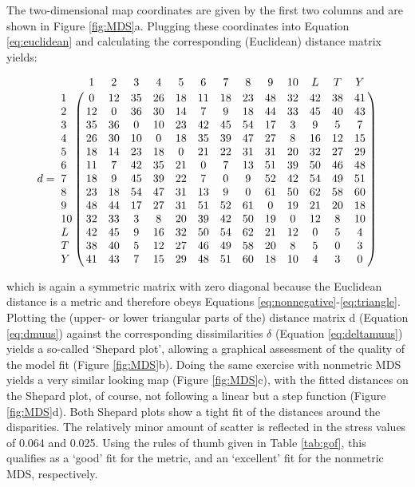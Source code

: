 \documentclass[authoryear,preprint,review,12pt]{elsarticle}
\begin{document}
The two-dimensional map coordinates are given by the first two columns
and are shown in Figure \ref{fig:MDS}a. Plugging these coordinates
into Equation \ref{eq:euclidean} and calculating the corresponding
(Euclidean) distance matrix yields:

\begin{equation}
d = \bordermatrix{
~ & 1 & 2 & 3 & 4 & 5 & 6 & 7 & 8 & 9 & 10 & L & T & Y\cr
1 & 0 & 12 & 35 & 26 & 18 & 11 & 18 & 23 & 48 & 32 & 42 & 38 & 41 \cr
2 & 12 & 0 & 36 & 30 & 14 & 7 & 9 & 18 & 44 & 33 & 45 & 40 & 43 \cr
3 & 35 & 36 & 0 & 10 & 23 & 42 & 45 & 54 & 17 & 3 & 9 & 5 & 7 \cr
4 & 26 & 30 & 10 & 0 & 18 & 35 & 39 & 47 & 27 & 8 & 16 & 12 & 15 \cr
5 & 18 & 14 & 23 & 18 & 0 & 21 & 22 & 31 & 31 & 20 & 32 & 27 & 29 \cr
6 & 11 & 7 & 42 & 35 & 21 & 0 & 7 & 13 & 51 & 39 & 50 & 46 & 48 \cr
7 & 18 & 9 & 45 & 39 & 22 & 7 & 0 & 9 & 52 & 42 & 54 & 49 & 51 \cr
8 & 23 & 18 & 54 & 47 & 31 & 13 & 9 & 0 & 61 & 50 & 62 & 58 & 60 \cr
9 & 48 & 44 & 17 & 27 & 31 & 51 & 52 & 61 & 0 & 19 & 21 & 20 & 18 \cr
10 & 32 & 33 & 3 & 8 & 20 & 39 & 42 & 50 & 19 & 0 & 12 & 8 & 10 \cr
L & 42 & 45 & 9 & 16 & 32 & 50 & 54 & 62 & 21 & 12 & 0 & 5 & 4 \cr
T & 38 & 40 & 5 & 12 & 27 & 46 & 49 & 58 & 20 & 8 & 5 & 0 & 3 \cr
Y & 41 & 43 & 7 & 15 & 29 & 48 & 51 & 60 & 18 & 10 & 4 & 3 & 0
}
\label{eq:dmuus}
\end{equation}

which is again a symmetric matrix with zero diagonal because the
Euclidean distance is a metric and therefore obeys Equations
\ref{eq:nonnegative}-\ref{eq:triangle}. Plotting the (upper- or lower
triangular parts of the) distance matrix d (Equation \ref{eq:dmuus})
against the corresponding dissimilarities $\delta$ (Equation
\ref{eq:deltamuus}) yields a so-called `Shepard plot', allowing a
graphical assessment of the quality of the model fit (Figure
\ref{fig:MDS}b).  Doing the same exercise with nonmetric MDS yields a
very similar looking map (Figure \ref{fig:MDS}c), with the fitted
distances on the Shepard plot, of course, not following a linear but a
step function (Figure \ref{fig:MDS}d).  Both Shepard plots show a
tight fit of the distances around the disparities. The relatively
minor amount of scatter is reflected in the stress values of 0.064 and
0.025. Using the rules of thumb given in Table \ref{tab:gof}, this
qualifies as a `good' fit for the metric, and an `excellent' fit for
the nonmetric MDS, respectively.\\
\end{document}
